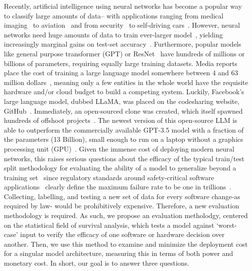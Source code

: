 \documentclass[conference]{IEEEtran}
\begin{document}
Recently, artificial intelligence using neural networks has become a popular way to classify large amounts of data-- with applications ranging from medical imaging~\cite{ai_medical_imaging} to aviation~\cite{ai_aviation} and from security~\cite{ai_security,ai_luggage,ai_prison} to self-driving cars~\cite{ai_automotive}. However, neural networks need huge amounts of data\cite{desislavov2021compute,bailly2022effects} to train ever-larger model~\cite{desislavov2021compute}, yielding increasingly marginal gains on test-set accuracy~\cite{sun2017revisiting}. Furthermore, popular models like general purpose transformer (GPT)\cite{floridi2020gpt} or ResNet~\cite{resnet} have hundreds of millions or billions of parameters, requiring equally large training datasets. Media reports place the cost of training a large language model somewhere between 4 and 63 million dollars~\cite{}, meaning only a few entities in the whole world have the requisite hardware and/or cloud budget to build a competing system. Luckily, Facebook's large language model, dubbed LLaMA, was placed on the codesharing website, GitHub~\cite{llama}. Immediately, an open-sourced clone was created, which itself spawned hundreds of offshoot projects~\cite{openllama}. The newest version of this open-source LLM is able to outperform the commercially available GPT-3.5 model with a fraction of the parameters (13 Billion), small enough to run on a laptop without a graphics processing unit (GPU)~\cite{liu2023goat}. Given the immense cost of deploying modern neural networks, this raises serious questions about the efficacy of the typical train/test split methodology for evaluating the ability of a model to generalize beyond a training set~\cite{meyers} since regulatory standards around safety-critical software applications~\cite{IEC61508,iso26262,aviation_software,safetyframework} clearly define the maximum failure rate to be one in trillions~\cite{iso26262}. Collecting, labelling, and testing a new set of data for every software change-as required by law- would be prohibitively expensive. Therefore, a new evaluation methodology is required. As such, we propose an evaluation metholodgy, centered on the statistical field of survival analysis, which tests a model against `worst-case' input to verify the efficacy of one software or hardware decision over another. Then, we use this method to examine and minimize the deployment cost for a singular model architecture, measuring this in terms of both power and monetary cost. In short, our goal is to answer three questions.
\end{document}
